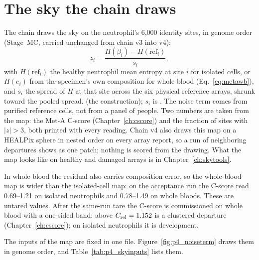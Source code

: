 \section{The sky the chain draws}

The chain draws the sky on the neutrophil's 6,000 identity sites, in genome order (Stage~MC, carried unchanged from chain v3 into v4):
\begin{equation}
  z_i=\frac{H(\beta_i)-H(\mathrm{ref}_i)}{s_i},
  \label{eq:sky}
\end{equation}
with $H(\mathrm{ref}_i)$ the healthy neutrophil mean entropy at site $i$ for isolated cells, or $H(e_i)$ from the specimen's own composition for whole
blood (Eq.~\eqref{eq:metawb}), and $s_i$ the spread of $H$ at that site across the six physical reference arrays, shrunk toward the pooled spread.
\derived{} (the construction); $s_i$ is \calibrated. The noise term comes from purified reference cells,
not from a panel of people. Two numbers are taken from the map: the Met-A C-score (Chapter~\ref{ch:cscore}) and the fraction of sites with $|z|>3$, both
printed with every reading. Chain v4 also draws this map on a HEALPix sphere in nested order on every array report, so a run of neighboring departures shows as one patch; nothing is scored from the drawing. What the map looks like on healthy and damaged arrays is in Chapter~\ref{ch:skytools}.

In whole blood the residual also carries composition error, so the whole-blood map is wider than the isolated-cell map: on the acceptance run the C-score
read 0.69--1.21 on isolated neutrophils and 0.78--1.49 on whole bloods. \measured{} These are untared values. After the same-run tare the C-score is commissioned on whole blood with a one-sided band: above $C_{\rm rel}=1.152$ is a clustered departure (Chapter~\ref{ch:cscore}); on isolated neutrophils it is development.

The inputs of the map are fixed in one file. Figure~\ref{fig:p4_noiseterm} draws them in genome order, and Table~\ref{tab:p4_skyinputs}
lists them.

